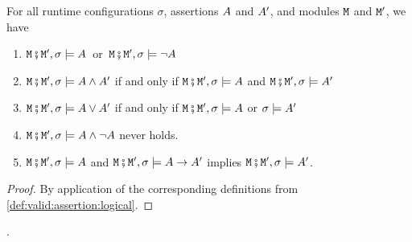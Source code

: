 \begin{lemma}
For all runtime configurations $\sigma$,    assertions $\A$ and $\A'$, and modules $\M$  and $\M'$, we have
\begin{enumerate}
\item
$\M\mkpair \M', \sigma \models \A$\ or\ $\M\mkpair \M', \sigma \models \neg\A$
\item
$\M\mkpair \M', \sigma  \models \A \wedge \A'$ \SP if and only if \SP $\M\mkpair \M', \sigma \models \A$ and $\M\mkpair \M', \sigma  \models \A'$
\item
$\M\mkpair \M', \sigma  \models \A \vee \A'$ \SP if and only if \SP $\M\mkpair \M', \sigma  \models \A$ or  $\sigma \models \A'$
\item
$\M\mkpair \M', \sigma  \models \A \wedge \neg\A$ never holds.
\item
$\M\mkpair \M', \sigma  \models \A$ and  $\M\mkpair \M', \sigma  \models \A \rightarrow \A'$  implies
$\M\mkpair \M', \sigma  \models \A '$.
\end{enumerate}
\end{lemma}
\begin{proof} By application of the corresponding definitions from \ref{def:valid:assertion:logical}.\end{proof}.
